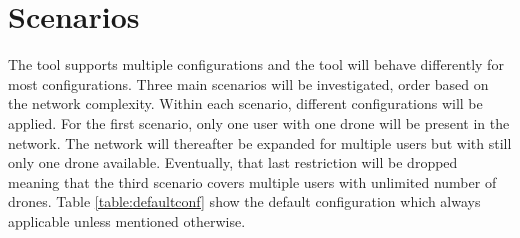 \chapter{Scenarios}
\label{chap:scenarios}
The tool supports multiple configurations and the tool will behave differently for most configurations. Three main scenarios 
will be investigated, order based on the network complexity. Within each scenario, different configurations will be applied.
For the first scenario, only one user with one drone will be present in the network. The network will thereafter be expanded
for multiple users but with still only one drone available. Eventually, that last restriction will be dropped meaning 
that the third scenario covers multiple users with unlimited number of drones. Table \ref{table:defaultconf} show the default configuration which 
always applicable unless mentioned otherwise.

